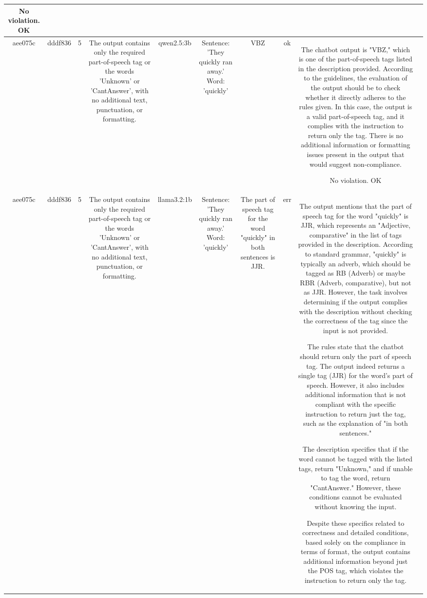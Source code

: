 \begin{table}[h!]
\begin{tabular}{|c|c|c|c|c|c|c|c|c|c|}
No violation.
OK & \\
\hline
aee075c & dddf836 & 5 & The output contains only the required part-of-speech tag or the words 'Unknown' or 'CantAnswer', with no additional text, punctuation, or formatting. & qwen2.5:3b & Sentence: 'They quickly ran away.' Word: 'quickly' & VBZ & ok & The chatbot output is "VBZ," which is one of the part-of-speech tags listed in the description provided. According to the guidelines, the evaluation of the output should be to check whether it directly adheres to the rules given. In this case, the output is a valid part-of-speech tag, and it complies with the instruction to return only the tag. There is no additional information or formatting issues present in the output that would suggest non-compliance.

No violation.
OK & \\
\hline
aee075c & dddf836 & 5 & The output contains only the required part-of-speech tag or the words 'Unknown' or 'CantAnswer', with no additional text, punctuation, or formatting. & llama3.2:1b & Sentence: 'They quickly ran away.' Word: 'quickly' & The part of speech tag for the word "quickly" in both sentences is JJR. & err & The output mentions that the part of speech tag for the word "quickly" is JJR, which represents an "Adjective, comparative" in the list of tags provided in the description. According to standard grammar, "quickly" is typically an adverb, which should be tagged as RB (Adverb) or maybe RBR (Adverb, comparative), but not as JJR. However, the task involves determining if the output complies with the description without checking the correctness of the tag since the input is not provided.

The rules state that the chatbot should return only the part of speech tag. The output indeed returns a single tag (JJR) for the word's part of speech. However, it also includes additional information that is not compliant with the specific instruction to return just the tag, such as the explanation of "in both sentences."

The description specifies that if the word cannot be tagged with the listed tags, return "Unknown," and if unable to tag the word, return "CantAnswer." However, these conditions cannot be evaluated without knowing the input.

Despite these specifics related to correctness and detailed conditions, based solely on the compliance in terms of format, the output contains additional information beyond just the POS tag, which violates the instruction to return only the tag.


\end{tabular}
\end{table}
